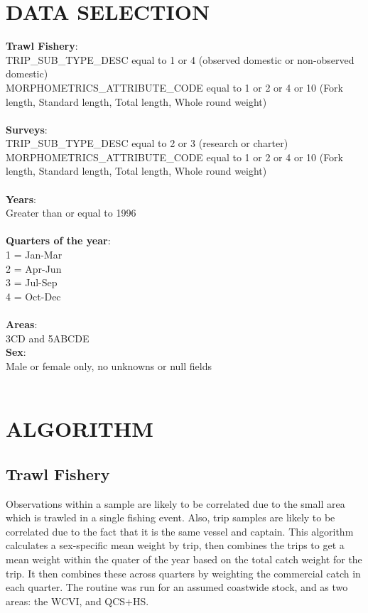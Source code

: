 \documentclass[11pt]{book}\usepackage[]{graphicx}\usepackage[]{color}
\begin{document}
\section{DATA SELECTION}
\textbf{Trawl Fishery}: \\
TRIP\_SUB\_TYPE\_DESC equal to 1 or 4 (observed domestic or non-observed domestic) \\
MORPHOMETRICS\_ATTRIBUTE\_CODE equal to 1 or 2 or 4 or 10 (Fork length, Standard length, Total length, Whole round weight) \\
\mbox{ }\\

\textbf{Surveys}: \\
TRIP\_SUB\_TYPE\_DESC equal to 2 or 3 (research or charter) \\
MORPHOMETRICS\_ATTRIBUTE\_CODE  equal to 1 or 2 or 4 or 10 (Fork length, Standard length, Total length, Whole round weight) \\
\mbox{ }\\

\textbf{Years}: \\
Greater than or equal to 1996 \\
\mbox{ }\\

\textbf{Quarters of the year}: \\
1 = Jan-Mar \\
2 = Apr-Jun \\
3 = Jul-Sep \\
4 = Oct-Dec \\
\mbox{ }\\

\textbf{Areas}: \\
3CD and 5ABCDE
\mbox{ }\\

\textbf{Sex}: \\
Male or female only, no unknowns or null fields \\
\mbox{ }\\

\section{ALGORITHM}

\subsection{Trawl Fishery}
Observations within a sample are likely to be correlated due to the small area which is trawled in a single fishing event. Also, trip samples
are likely to be correlated due to the fact that it is the same vessel and captain. This algorithm calculates a sex-specific mean weight by
trip, then combines the trips to get a mean weight within the quater of the year based on the total catch weight for the trip. It then combines
these across quarters by weighting the commercial catch in each quarter. The routine was run for an assumed coastwide stock, and as two areas:
the WCVI, and QCS+HS.
\end{document}
